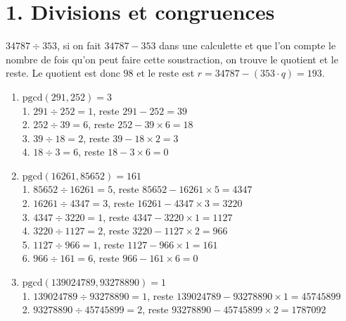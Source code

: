 
\section*{1. Divisions et congruences}

\begin{solution}
    $34787 \div 353$, si on fait $34787 - 353$ dans une calculette et que l'on compte le nombre de fois qu'on peut faire cette soustraction, on trouve le quotient et le reste. Le quotient est donc $98$ et le reste est $r=34787 - (353 \cdot q) = 193$.
\end{solution}

\begin{solution}
    \text{ }
    \begin{enumerate}[label=(\alph*)]
        \item \( \text{pgcd}(291, 252) = 3\)\\
        1. \( 291 \div 252 = 1 \), reste \( 291 - 252 = 39 \) \\
        2. \( 252 \div 39 = 6 \), reste \( 252 - 39 \times 6 = 18 \) \\
        3. \( 39 \div 18 = 2 \), reste \( 39 - 18 \times 2 = 3 \) \\
        4. \( 18 \div 3 = 6 \), reste \( 18 - 3 \times 6 = 0 \) \\
        \item \( \text{pgcd}(16261, 85652) = 161 \) \\
        1. \( 85652 \div 16261 = 5 \), reste \( 85652 - 16261 \times 5 = 4347 \) \\
        2. \( 16261 \div 4347 = 3 \), reste \( 16261 - 4347 \times 3 = 3220 \) \\
        3. \( 4347 \div 3220 = 1 \), reste \( 4347 - 3220 \times 1 = 1127 \) \\
        4. \( 3220 \div 1127 = 2 \), reste \( 3220 - 1127 \times 2 = 966 \) \\
        5. \( 1127 \div 966 = 1 \), reste \( 1127 - 966 \times 1 = 161 \) \\
        6. \( 966 \div 161 = 6 \), reste \( 966 - 161 \times 6 = 0 \) \\
        \item \( \text{pgcd}(139024789, 93278890) = 1 \)\\
        1. \( 139024789 \div 93278890 = 1\), reste \( 139024789 - 93278890 \times 1 = 45745899 \) \\
        2. \( 93278890 \div 45745899 = 2\), reste \( 93278890 - 45745899 \times 2 = 1787092 \) \\

\end{enumerate}
\end{solution}
